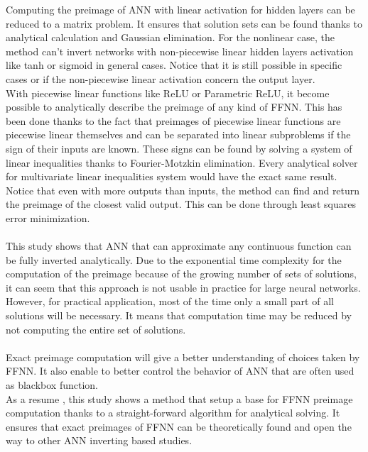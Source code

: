 \documentclass{article}
\begin{document}
Computing the preimage of ANN with linear activation for hidden layers can be reduced to a matrix problem. 
It ensures that solution sets can be found thanks to analytical calculation and Gaussian elimination. 
For the nonlinear case, the method can’t invert networks with non-piecewise linear hidden layers activation like tanh or sigmoid in general cases. 
Notice that it is still possible in specific cases or if the non-piecewise linear activation concern the output layer.\\ 
With piecewise linear functions like ReLU or Parametric ReLU, it become possible to analytically describe the preimage of
any kind of FFNN. This has been done thanks to the fact that preimages of piecewise linear functions are piecewise linear themselves and can
be separated into linear subproblems if the sign of their inputs are known. These signs can be found by solving a system of linear 
inequalities thanks to Fourier-Motzkin elimination. Every analytical solver for multivariate linear inequalities system would 
have the exact same result.\\ Notice that even with more outputs than inputs, the method can find and return the preimage of the closest valid output. 
This can be done through least squares error minimization.\\\\
This study shows that ANN that can approximate any continuous function can be fully inverted analytically. 
Due to the exponential time complexity for the computation of the preimage because of the growing number of sets of solutions, 
it can seem that this approach is not usable in practice for large neural networks. However, for practical application, most of the time only a
small part of all solutions will be necessary. It means that computation time may be reduced by not computing the entire set of solutions. \\\\
Exact preimage computation will give a better understanding of choices taken by FFNN. It also enable to better control 
the behavior of ANN that are often used as blackbox function.\\ As a resume , this study shows a method that setup a base for FFNN preimage 
computation thanks to a straight-forward algorithm for analytical solving. It ensures that exact preimages of FFNN can be theoretically 
found and open the way to other ANN inverting based studies.
\end{document}
